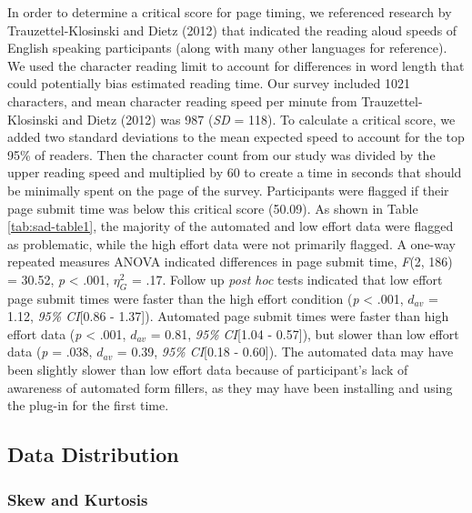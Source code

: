 \documentclass[english,man]{apa6}
\theoremstyle{definition}
\theoremstyle{definition}
\theoremstyle{definition}
\theoremstyle{remark}
\begin{document}
In order to determine a critical score for page timing, we referenced
research by Trauzettel-Klosinski and Dietz (2012) that indicated the
reading aloud speeds of English speaking participants (along with many
other languages for reference). We used the character reading limit to
account for differences in word length that could potentially bias
estimated reading time. Our survey included 1021 characters, and mean
character reading speed per minute from Trauzettel-Klosinski and Dietz
(2012) was 987 (\emph{SD} = 118). To calculate a critical score, we
added two standard deviations to the mean expected speed to account for
the top 95\% of readers. Then the character count from our study was
divided by the upper reading speed and multiplied by 60 to create a time
in seconds that should be minimally spent on the page of the survey.
Participants were flagged if their page submit time was below this
critical score (50.09). As shown in Table \ref{tab:sad-table1}, the
majority of the automated and low effort data were flagged as
problematic, while the high effort data were not primarily flagged. A
one-way repeated measures ANOVA indicated differences in page submit
time, \emph{F}(2, 186) = 30.52, \emph{p} \textless{} .001, \(\eta_G^2\)
= .17. Follow up \emph{post hoc} tests indicated that low effort page
submit times were faster than the high effort condition (\emph{p}
\textless{} .001, \(d_{av}\) = 1.12, \emph{95\% CI}{[}0.86 - 1.37{]}).
Automated page submit times were faster than high effort data (\emph{p}
\textless{} .001, \(d_{av}\) = 0.81, \emph{95\% CI}{[}1.04 - 0.57{]}),
but slower than low effort data (\emph{p} = .038, \(d_{av}\) = 0.39,
\emph{95\% CI}{[}0.18 - 0.60{]}). The automated data may have been
slightly slower than low effort data because of participant's lack of
awareness of automated form fillers, as they may have been installing
and using the plug-in for the first time.

\subsection{Data Distribution}\label{data-distribution-1}

\subsubsection{Skew and Kurtosis}\label{skew-and-kurtosis}
\end{document}
